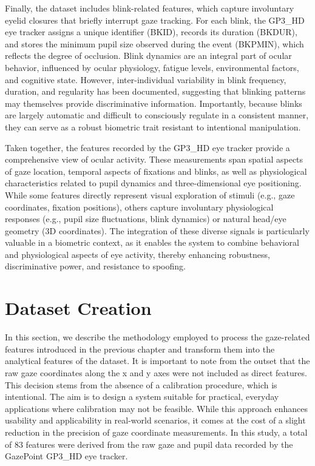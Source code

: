 \documentclass[12pt]{report}
\begin{document}
Finally, the dataset includes blink-related features, which capture involuntary eyelid closures that briefly interrupt gaze tracking. 
For each blink, the GP3\_HD eye tracker assigns a unique identifier (BKID), records its duration (BKDUR), and stores the minimum pupil size observed during the event (BKPMIN), which reflects the degree of occlusion. 
Blink dynamics are an integral part of ocular behavior, influenced by ocular physiology, fatigue levels, environmental factors, and cognitive state. 
However, inter-individual variability in blink frequency, duration, and regularity has been documented, suggesting that blinking patterns may themselves provide discriminative information. 
Importantly, because blinks are largely automatic and difficult to consciously regulate in a consistent manner, they can serve as a robust biometric trait resistant to intentional manipulation.

Taken together, the features recorded by the GP3\_HD eye tracker provide a comprehensive view of ocular activity. 
These measurements span spatial aspects of gaze location, temporal aspects of fixations and blinks, as well as physiological characteristics related to pupil dynamics and three-dimensional eye positioning.
While some features directly represent visual exploration of stimuli (e.g., gaze coordinates, fixation positions), others capture involuntary physiological responses (e.g., pupil size fluctuations, blink dynamics) or natural head/eye geometry (3D coordinates). 
The integration of these diverse signals is particularly valuable in a biometric context, as it enables the system to combine behavioral and physiological aspects of eye activity, thereby enhancing robustness, discriminative power, and resistance to spoofing.

\section{Dataset Creation}

In this section, we describe the methodology employed to process the gaze-related features introduced in the previous chapter and transform them into the analytical features of the dataset. 
It is important to note from the outset that the raw gaze coordinates along the x and y axes were not included as direct features. 
This decision stems from the absence of a calibration procedure, which is intentional. 
The aim is to design a system suitable for practical, everyday applications where calibration may not be feasible. 
While this approach enhances usability and applicability in real-world scenarios, it comes at the cost of a slight reduction in the precision of gaze coordinate measurements.
In this study, a total of 83 features were derived from the raw gaze and pupil data recorded by the GazePoint GP3\_HD eye tracker. 
\end{document}
